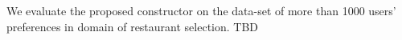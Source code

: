 \label{sec_eval}
We evaluate the proposed constructor on the data-set of more than 1000 users' preferences in domain of restaurant selection.
TBD
